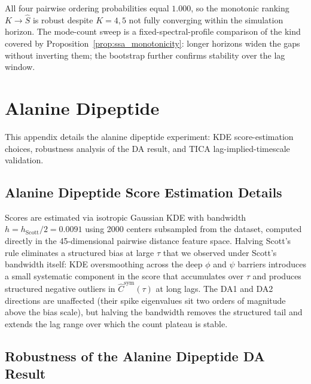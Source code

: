 \documentclass{article}
\begin{document}
All four pairwise ordering probabilities equal $1.000$, so the
monotonic ranking $K \to \hat S$ is robust despite $K = 4, 5$ not
fully converging within the simulation horizon. The mode-count sweep is a fixed-spectral-profile comparison of the kind covered by Proposition~\ref{prop:ssa_monotonicity}: longer horizons widen the gaps without inverting them; the bootstrap further confirms stability over the lag window.


\section{Alanine Dipeptide}
\label{app:alanine_full}



This appendix details the alanine dipeptide experiment: KDE score-estimation choices, robustness analysis of the DA result, and TICA lag-implied-timescale validation.

\subsection{Alanine Dipeptide Score Estimation Details}
\label{app:alanine_details}

Scores are estimated via isotropic Gaussian KDE with bandwidth
$h = h_{\mathrm{Scott}}/2 = 0.0091$ using 2000 centers subsampled from
the dataset, computed directly in the 45-dimensional pairwise distance
feature space. Halving Scott's rule eliminates a structured bias at
large $\tau$ that we observed under Scott's bandwidth itself: KDE
oversmoothing across the deep $\phi$ and $\psi$ barriers introduces a
small systematic component in the score that accumulates over $\tau$
and produces structured negative outliers in $\hat C^{\mathrm{sym}}(\tau)$
at long lags. The DA1 and DA2 directions are unaffected (their spike
eigenvalues sit two orders of magnitude above the bias scale), but
halving the bandwidth removes the structured tail and extends the lag
range over which the count plateau is stable.

\subsection{Robustness of the Alanine Dipeptide DA Result}
\label{app:alanine_robustness}
\end{document}
